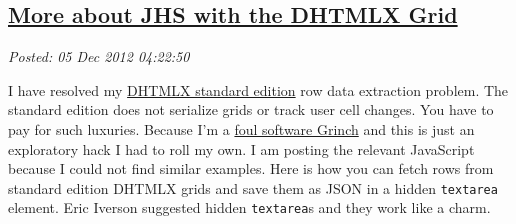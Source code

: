%

\subsection*{\href{https://bakerjd99.wordpress.com/2012/12/04/more-about-jhs-with-dhtmlx-the-grid/}{More about JHS with the DHTMLX Grid}}


\noindent\emph{Posted: 05 Dec 2012 04:22:50}
\vspace{6pt}

I have resolved my \href{http://dhtmlx.com/docs/download.shtml}{DHTMLX
standard edition} row data extraction problem. The standard edition does
not serialize grids or track user cell changes. You have to pay for such
luxuries. Because I'm a
\href{http://www.youtube.com/watch?v=ZgP0aUKlmNw}{foul software Grinch}
and this is just an exploratory hack I had to roll my own. I am posting
the relevant JavaScript because I could not find similar examples. Here
is how you can fetch rows from standard edition DHTMLX grids and save
them as JSON in a hidden \texttt{textarea} element. Eric Iverson
suggested hidden \texttt{textarea}s and they work like a charm.

